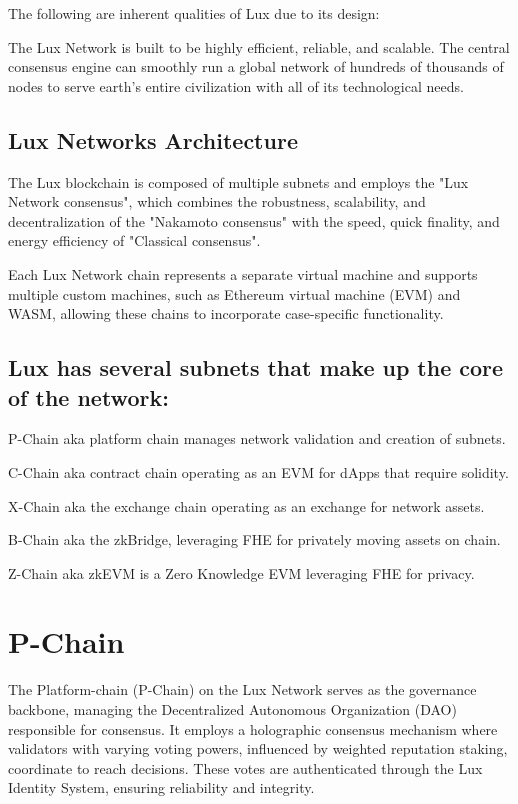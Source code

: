 \documentclass[11pt]{article}
\begin{document}
The following are inherent qualities of Lux due to its design:


The Lux Network is built to be highly efficient, reliable, and scalable. The central consensus engine can smoothly run a global network of hundreds of thousands of nodes to serve earth's entire civilization with all of its technological needs.


\subsection{Lux Networks Architecture}

The Lux blockchain is composed of multiple subnets and employs the "Lux Network consensus", which combines the robustness, scalability, and decentralization of the "Nakamoto consensus" with the speed, quick finality, and energy efficiency of "Classical consensus".


Each Lux Network chain represents a separate virtual machine and supports multiple custom machines, such as Ethereum virtual machine (EVM) and WASM, allowing these chains to incorporate case-specific functionality.


\subsection{Lux has several subnets that make up the core of the network:}

P-Chain aka platform chain manages network validation and creation of subnets.


C-Chain aka contract chain operating as an EVM for dApps that require solidity.


X-Chain aka the exchange chain operating as an exchange for network assets.


B-Chain  aka the zkBridge, leveraging FHE for privately moving assets on chain.


Z-Chain  aka zkEVM is a Zero Knowledge EVM leveraging FHE for privacy.


\section{P-Chain}

The Platform-chain (P-Chain) on the Lux Network serves as the governance backbone, managing the Decentralized Autonomous Organization (DAO) responsible for consensus. It employs a holographic consensus mechanism where validators with varying voting powers, influenced by weighted reputation staking, coordinate to reach decisions. These votes are authenticated through the Lux Identity System, ensuring reliability and integrity.
\end{document}
